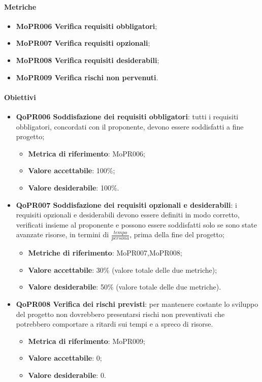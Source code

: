 \documentclass[../piano-di-qualifica.tex]{subfiles}
\begin{document}
\paragraph{Metriche}
\label{sub:metriche_2}
\begin{itemize}
    \item \textbf{MoPR006 Verifica requisiti obbligatori};
    \item \textbf{MoPR007 Verifica requisiti opzionali};
    \item \textbf{MoPR008 Verifica requisiti desiderabili};
    \item \textbf{MoPR009 Verifica rischi non pervenuti}.
\end{itemize}

\paragraph{Obiettivi}
\label{sub:obiettivi_2}
\begin{itemize}
    \item \textbf{QoPR006 Soddisfazione dei requisiti obbligatori}: tutti i requisiti obbligatori, concordati con il proponente, devono essere soddisfatti a fine progetto;
        \begin{itemize}
            \item \textbf{Metrica di riferimento}: MoPR006;
            \item \textbf{Valore accettabile}: 100\%; %
            \item \textbf{Valore desiderabile}: 100\%.
        \end{itemize}
    \item \textbf{QoPR007 Soddisfazione dei requisiti opzionali e desiderabili}: i requisiti opzionali e desiderabili devono essere definiti in modo corretto, verificati insieme al proponente e possono essere soddisfatti solo se sono state avanzate risorse, in termini di $\frac{tempo}{persona}$, prima della fine del progetto;
        \begin{itemize}
            \item \textbf{Metriche di riferimento}: MoPR007,MoPR008;
            \item \textbf{Valore accettabile}: 30\% (valore totale delle due metriche); %
            \item \textbf{Valore desiderabile}: 50\% (valore totale delle due metriche).
        \end{itemize}
    \item \textbf{QoPR008 Verifica dei rischi previsti}: per mantenere costante lo sviluppo del progetto non dovrebbero presentarsi rischi non preventivati che potrebbero comportare a ritardi sui tempi e a spreco di risorse.
        \begin{itemize}
            \item \textbf{Metrica di riferimento}: MoPR009;
            \item \textbf{Valore accettabile}: 0; %
            \item \textbf{Valore desiderabile}: 0.
        \end{itemize}
\end{itemize}
\end{document}
